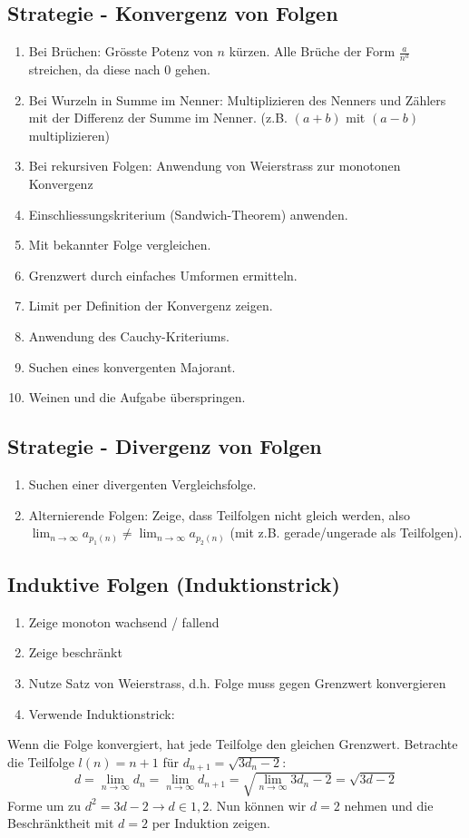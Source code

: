 \documentclass[8pt]{extarticle}
\def\limn{\lim_{n\to \infty}}
\begin{document}
\begin{multicols*}{3}
\subsection{Strategie - Konvergenz von Folgen}
\begin{enumerate}
 \item Bei Brüchen: Grösste Potenz von $n$ kürzen. Alle Brüche der Form $\frac{a}{n^a}$ streichen, da diese nach 0 gehen.
 \item Bei Wurzeln in Summe im Nenner: Multiplizieren des Nenners und Zählers mit der Differenz der Summe im Nenner. (z.B. $(a+b)$ mit $(a-b)$ multiplizieren)
 \item Bei rekursiven Folgen: Anwendung von Weierstrass zur monotonen Konvergenz
 \item Einschliessungskriterium (Sandwich-Theorem) anwenden.
 \item Mit bekannter Folge vergleichen.
 \item Grenzwert durch einfaches Umformen ermitteln.
 \item Limit per Definition der Konvergenz zeigen.
 \item Anwendung des Cauchy-Kriteriums.
 \item Suchen eines konvergenten Majorant.
 \item Weinen und die Aufgabe überspringen.
\end{enumerate}

\subsection{Strategie - Divergenz von Folgen}
\begin{enumerate}
 \item Suchen einer divergenten Vergleichsfolge.
 \item Alternierende Folgen: Zeige, dass Teilfolgen nicht gleich werden, also $\limn a_{p_1(n)} \ne \limn a_{p_2(n)}$ (mit z.B. gerade/ungerade als Teilfolgen).
\end{enumerate}
\subsection{Induktive Folgen (Induktionstrick)}
\begin{enumerate}
  \item Zeige monoton wachsend / fallend
  \item Zeige beschränkt
  \item Nutze Satz von Weierstrass, d.h. Folge muss gegen Grenzwert konvergieren
  \item Verwende Induktionstrick:
\end{enumerate}
Wenn die Folge konvergiert, hat jede Teilfolge den gleichen Grenzwert. Betrachte die Teilfolge $l(n) = n + 1$ für $d_{n+1} = \sqrt{3d_n - 2}$:
$$d = \lim_{n\to\infty} d_n = \lim_{n\to\infty} d_{n+1} = \sqrt{\lim_{n \to \infty} 3d_n -2} = \sqrt{3d -2}$$
Forme um zu $ d^2 = 3d -2 \to d \in {1,2}$. Nun können wir $d = 2$ nehmen und die Beschränktheit mit $d=2$ per Induktion zeigen.


\end{multicols*}
\end{document}
